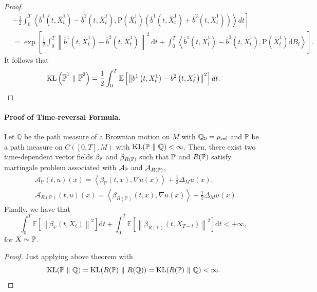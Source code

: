 \begin{proof}
\begin{align*}
        & \left.-\frac{1}{2} \int_0^T\left\langle\bar{b}^1\left(t, \bar{{X}}_t^1\right)-\bar{b}^2\left(t, \bar{{X}}_t^1\right), \mathrm{P}\left(\bar{{X}}_t^1\right)\left(\bar{b}^1\left(t, \bar{{X}}_t^1\right)+\bar{b}^2\left(t, \bar{{X}}_t^1\right)\right)\right\rangle d t\right]\\
        &= \exp \left[\frac{1}{2} \int_0^T\left\|\bar{b}^1\left(t, \overline{{X}}_t^1\right)-\bar{b}^2\left(t, \overline{{X}}_t^1\right)\right\|^2 \mathrm{~d} t+\int_0^T\left\langle\bar{b}^1\left(t, \overline{{X}}_t^1\right)-\bar{b}^2\left(t, \overline{{X}}_t^1\right), \mathrm{P}\left(\overline{{X}}_t^1\right) \mathrm{d} {B}_t\right\rangle\right] .
    \end{align*}
    It follows that
    \begin{equation*}
        \operatorname{KL}\left(\overline{\mathbb{P}}^1 ~\Vert~ \overline{\mathbb{P}}^2\right)=\frac{1}{2} \int_0^T \mathbb{E}\left[\left\|b^1\left(t, {X}_t^1\right)-b^2\left(t, {X}_t^1\right)\right\|^2\right] d t.\qedhere
    \end{equation*}
\end{proof}

\paragraph{Proof of Time-reversal Formula.}

\begin{cor}
    Let $\mathbb{Q}$ be the path measure of a Brownian motion on $M$ with $\mathbb{Q}_0 = p_{\operatorname{ref}}$ and $\mathbb{P}$ be a path measure on $C([0,T],M)$ with $\operatorname{KL}(\mathbb{P} ~\Vert~\mathbb{Q}) < \infty$. Then, there exist two time-dependent vector fields $\beta_{\mathbb{P}}$ and $\beta_{R(\mathbb{P})}$ such that $\mathbb{P}$ and $R(\mathbb{P})$ satisfy martingale problem associated with $\mathcal{A}_{\mathbb{P}}$ and $\mathcal{A}_{R(\mathbb{P})}$,
    \begin{align*}
        & \mathcal{A}_{\mathbb{P}}(t, u)(x)=\left\langle\beta_{\mathbb{P}}(t, x), \nabla u(x)\right\rangle+\frac{1}{2} \Delta_{M} u(x), \\
        & \mathcal{A}_{R(\mathbb{P})}(t, u)(x)=\left\langle\beta_{R(\mathbb{P})}(t, x), \nabla u(x)\right\rangle+\frac{1}{2} \Delta_{M} u(x) .
    \end{align*}
    Finally, we have that
    \begin{equation*}
        \int_0^T \mathbb{E}\left[\left\|\beta_{\mathbb{P}}\left(t, {X}_t\right)\right\|^2\right] \mathrm{d} t+\int_0^T \mathbb{E}\left[\left\|\beta_{R(\mathbb{P})}\left(t, {X}_{T-t}\right)\right\|^2\right] \mathrm{d} t<+\infty,
    \end{equation*}
    for $X \sim \mathbb{P}$.
\end{cor}
\begin{proof}
    Just applying above theorem with
    \begin{equation*}
        \operatorname{KL}(\mathbb{P} ~\Vert~ \mathbb{Q}) = \operatorname{KL}(R(\mathbb{P}) ~\Vert~ R(\mathbb{Q})) = \operatorname{KL}(R(\mathbb{P}) ~\Vert~ \mathbb{Q}) <\infty. \qedhere
    \end{equation*}
\end{proof}

